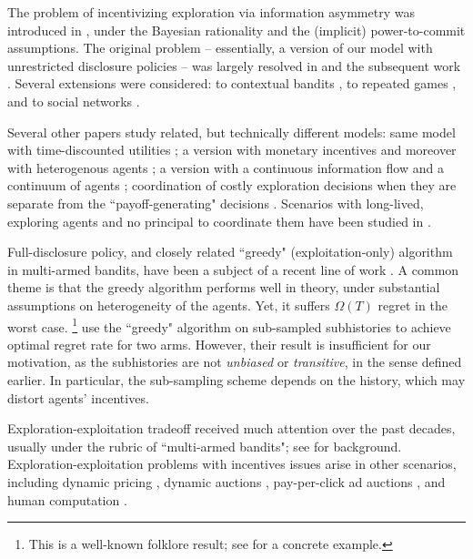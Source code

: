 The problem of incentivizing exploration via information asymmetry was introduced in \cite{Kremer-JPE14}, under the Bayesian rationality and the (implicit) power-to-commit assumptions. The original problem -- essentially, a version of our model with unrestricted disclosure policies -- was largely resolved in \cite{Kremer-JPE14} and the subsequent work \citep{ICexploration-ec15,ICexplorationGames-ec16}. Several extensions were considered: to contextual bandits \citep{ICexploration-ec15}, to repeated games
\citep{ICexplorationGames-ec16}, and to social networks \citep{Bahar-ec16}.

Several other papers study related, but technically different models: same model with time-discounted utilities \citep{Bimpikis-exploration-ms17}; a version with monetary incentives \citep{Frazier-ec14} and moreover with heterogenous agents \citep{Kempe-colt18}; a version with a continuous information flow and a continuum of agents \citep{Che-13}; coordination of costly exploration decisions when they are separate from the ``payoff-generating" decisions \citep{Bobby-Glen-ec16,Annie-ec18-traps,Liang-ec18}. Scenarios with long-lived, exploring agents and no principal to coordinate them have been studied in \citep{Bolton-econometrica99,Keller-econometrica05}.

Full-disclosure policy, and closely related ``greedy" (exploitation-only) algorithm in multi-armed bandits, have been a subject of a recent line of work \citep{Sven-aistats18,kannan2018smoothed,bastani2017exploiting,externalities-colt18}.
A common theme is that the greedy algorithm performs well in theory, under  substantial assumptions on heterogeneity of the agents. Yet, it suffers $\Omega(T)$ regret in the worst case.%
\footnote{This is a well-known folklore result; \eg see \citep{CompetingBandits-itcs18} for a concrete example.}
\citet{Baransi-ecml14} use the ``greedy" algorithm on sub-sampled subhistories to achieve optimal regret rate for two arms. However, their result is insufficient for our motivation, as the subhistories are not \emph{unbiased} or \emph{transitive}, in the sense defined earlier. In particular, the sub-sampling scheme depends on the history, which may distort agents' incentives.

Exploration-exploitation tradeoff received much attention over the past decades, usually under the rubric of ``multi-armed bandits"; see  \citep{Bubeck-survey12%
} for background.
Exploration-exploitation problems with incentives issues arise in other scenarios, including dynamic pricing
    \citep{KleinbergL03,BZ09,BwK-focs13},
dynamic auctions
    \citep{AtheySegal-econometrica13,DynPivot-econometrica10,Kakade-pivot-or13},
pay-per-click ad auctions
    \citep{MechMAB-ec09,DevanurK09,Transform-ec10-jacm},
and human computation
    \citep{RepeatedPA-ec14,Ghosh-itcs13,Krause-www13}.
